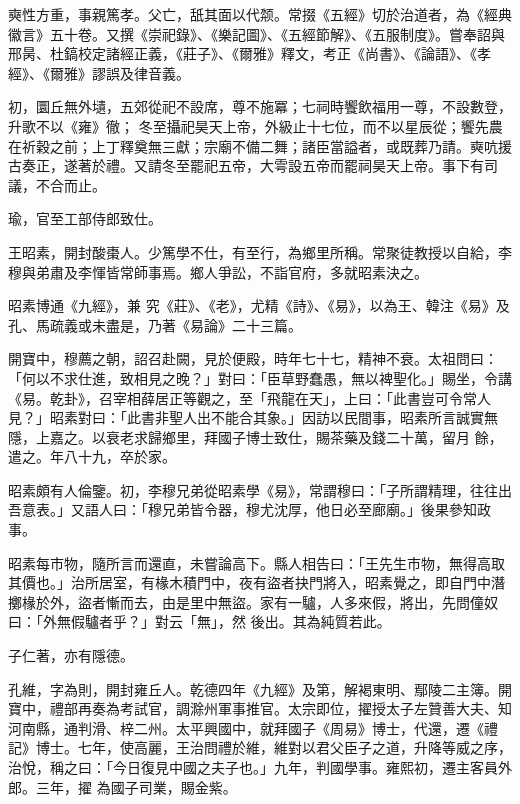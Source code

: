 \begin{pinyinscope}
 奭性方重，事親篤孝。父亡，舐其面以代颒。常掇《五經》切於治道者，為《經典徽言》五十卷。又撰《崇祀錄》、《樂記圖》、《五經節解》、《五服制度》。嘗奉詔與邢昺、杜鎬校定諸經正義，《莊子》、《爾雅》釋文，考正《尚書》、《論語》、《孝經》、《爾雅》謬誤及律音義。



 初，圜丘無外壝，五郊從祀不設席，尊不施冪；七祠時饗飲福用一尊，不設數登，升歌不以《雍》徹；
 冬至攝祀昊天上帝，外級止十七位，而不以星辰從；饗先農在祈穀之前；上丁釋奠無三獻；宗廟不備二舞；諸臣當謚者，或既葬乃請。奭吭援古奏正，遂著於禮。又請冬至罷祀五帝，大雩設五帝而罷祠昊天上帝。事下有司議，不合而止。



 瑜，官至工部侍郎致仕。



 王昭素，開封酸棗人。少篤學不仕，有至行，為鄉里所稱。常聚徒教授以自給，李穆與弟肅及李惲皆常師事焉。鄉人爭訟，不詣官府，多就昭素決之。



 昭素博通《九經》，兼
 究《莊》、《老》，尤精《詩》、《易》，以為王、韓注《易》及孔、馬疏義或未盡是，乃著《易論》二十三篇。



 開寶中，穆薦之朝，詔召赴闕，見於便殿，時年七十七，精神不衰。太祖問曰：「何以不求仕進，致相見之晚？」對曰：「臣草野蠢愚，無以裨聖化。」賜坐，令講《易。乾卦》，召宰相薛居正等觀之，至「飛龍在天」，上曰：「此書豈可令常人見？」昭素對曰：「此書非聖人出不能合其象。」因訪以民間事，昭素所言誠實無隱，上嘉之。以衰老求歸鄉里，拜國子博士致仕，賜茶藥及錢二十萬，留月
 餘，遣之。年八十九，卒於家。



 昭素頗有人倫鑒。初，李穆兄弟從昭素學《易》，常謂穆曰：「子所謂精理，往往出吾意表。」又語人曰：「穆兄弟皆令器，穆尤沈厚，他日必至廊廟。」後果參知政事。



 昭素每市物，隨所言而還直，未嘗論高下。縣人相告曰：「王先生市物，無得高取其價也。」治所居室，有椽木積門中，夜有盜者抉門將入，昭素覺之，即自門中潛擲椽於外，盜者慚而去，由是里中無盜。家有一驢，人多來假，將出，先問僮奴曰：「外無假驢者乎？」對云「無」，然
 後出。其為純質若此。



 子仁著，亦有隱德。



 孔維，字為則，開封雍丘人。乾德四年《九經》及第，解褐東明、鄢陵二主簿。開寶中，禮部再奏為考試官，調滁州軍事推官。太宗即位，擢授太子左贊善大夫、知河南縣，通判滑、梓二州。太平興國中，就拜國子《周易》博士，代還，遷《禮記》博士。七年，使高麗，王治問禮於維，維對以君父臣子之道，升降等威之序，治悅，稱之曰：「今日復見中國之夫子也。」九年，判國學事。雍熙初，遷主客員外郎。三年，擢
 為國子司業，賜金紫。




\end{pinyinscope}
